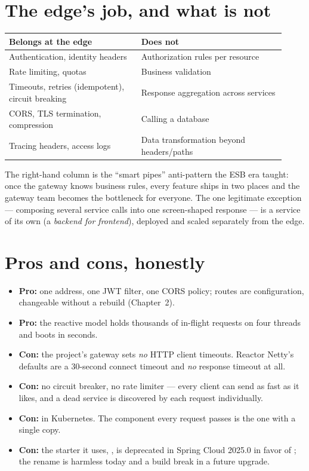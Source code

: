 \section{The edge's job, and what is not}

\begin{center}
\small
\begin{tabular}{@{}p{0.44\linewidth}p{0.48\linewidth}@{}}
\toprule
Belongs at the edge & Does not \\
\midrule
Authentication, identity headers & Authorization rules per resource \\
Rate limiting, quotas & Business validation \\
Timeouts, retries (idempotent), circuit breaking & Response aggregation across services \\
CORS, TLS termination, compression & Calling a database \\
Tracing headers, access logs & Data transformation beyond headers/paths \\
\bottomrule
\end{tabular}
\end{center}

The right-hand column is the ``smart pipes'' anti-pattern the ESB era
taught: once the gateway knows business rules, every feature ships in
two places and the gateway team becomes the bottleneck for everyone. The
one legitimate exception --- composing several service calls into one
screen-shaped response --- is a service of its own (a \emph{backend for
frontend}), deployed and scaled separately from the edge.

\section{Pros and cons, honestly}

\begin{itemize}
  \item \textbf{Pro:} one address, one JWT filter, one CORS policy;
  routes are configuration, changeable without a rebuild
  (Chapter~2).
  \item \textbf{Pro:} the reactive model holds thousands of in-flight
  requests on four threads and boots in seconds.
  \item \textbf{Con:} the project's gateway sets \emph{no} HTTP client
  timeouts. Reactor Netty's defaults are a 30-second connect timeout and
  \emph{no} response timeout at all.
  \item \textbf{Con:} no circuit breaker, no rate limiter --- every
  client can send as fast as it likes, and a dead service is discovered
  by each request individually.
  \item \textbf{Con:}  in Kubernetes. The component
  every request passes is the one with a single copy.
  \item \textbf{Con:} the starter it uses, ,
  is deprecated in Spring Cloud 2025.0 in favor of
  ; the rename is
  harmless today and a build break in a future upgrade.
\end{itemize}

